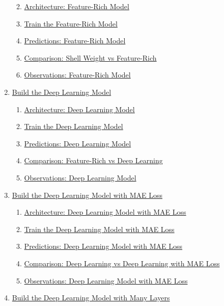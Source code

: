 \documentclass[11pt]{article}
\providecommand{\tightlist}{%
      \setlength{\itemsep}{0pt}\setlength{\parskip}{0pt}}
\begin{document}
\begin{enumerate}
  \begin{enumerate}
  \def\labelenumii{\arabic{enumii}.}
  \tightlist
  \item
    \hyperref[architecture-feature-rich-model]{Architecture: Feature-Rich Model}
  \item
    \hyperref[train-the-feature-rich-model]{Train the Feature-Rich Model}
  \item
    \hyperref[predictions-feature-rich-model]{Predictions: Feature-Rich Model}
  \item
    \hyperref[comparison-shell-weight-vs-feature-rich]{Comparison: Shell Weight vs Feature-Rich}
  \item
    \hyperref[observations-feature-rich-model]{Observations: Feature-Rich Model}
  \end{enumerate}
\item
  \hyperref[build-the-deep-learning-model]{Build the Deep Learning Model}

  \begin{enumerate}
  \def\labelenumii{\arabic{enumii}.}
  \tightlist
  \item
    \hyperref[architecture-deep-learning-model]{Architecture: Deep Learning Model}
  \item
    \hyperref[train-the-deep-learning-model]{Train the Deep Learning Model}
  \item
    \hyperref[predictions-deep-learning-model]{Predictions: Deep Learning Model}
  \item
    \hyperref[comparison-feature-rich-vs-deep-learning]{Comparison: Feature-Rich vs Deep Learning}
  \item
    \hyperref[observations-deep-learning-model]{Observations: Deep Learning Model}
  \end{enumerate}
\item
  \hyperref[build-the-deep-learning-model-with-mae-loss]{Build the Deep Learning Model with MAE Loss}

  \begin{enumerate}
  \def\labelenumii{\arabic{enumii}.}
  \tightlist
  \item
    \hyperref[architecture-deep-learning-model-with-mae-loss]{Architecture: Deep Learning Model with MAE Loss}
  \item
    \hyperref[train-the-deep-learning-model-with-mae-loss]{Train the Deep Learning Model with MAE Loss}
  \item
    \hyperref[predictions-deep-learning-model-with-mae-loss]{Predictions: Deep Learning Model with MAE Loss}
  \item
    \hyperref[comparison-deep-learning-vs-deep-learning-with-mae-loss]{Comparison: Deep Learning vs Deep Learning with MAE Loss}
  \item
    \hyperref[observations-deep-learning-model-with-mae-loss]{Observations: Deep Learning Model with MAE Loss}
  \end{enumerate}
\item
  \hyperref[build-the-deep-learning-model-with-many-layers]{Build the Deep Learning Model with Many Layers}


\end{enumerate}
\end{document}
